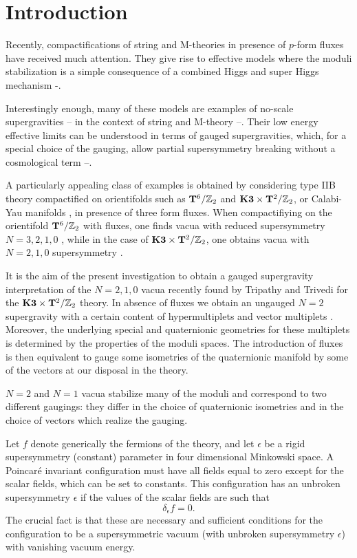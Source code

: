 \documentclass[a4paper,12pt]{article}
\begin{document}
\vfill\eject


\section{Introduction}

Recently, compactifications of string and M-theories in presence
of $p$-form fluxes have received much attention. They give rise to
effective models where the moduli stabilization is a simple
consequence of a combined Higgs and super Higgs mechanism
\cite{ps}-\cite{tt}.

Interestingly enough, many of these models are examples of
no-scale supergravities  \cite{cfkn}--\cite{ckpdfwg} in the
context of string and M-theory \cite{tv}\cite{cklt}--\cite{lm}.
Their low energy effective limits can be understood in terms  of
gauged supergravities, which, for a special choice of the gauging,
allow partial supersymmetry breaking without a cosmological term
\cite{adflf,adfld}\cite{cgp}--\cite{tz}.

A particularly appealing class of examples is obtained by
considering type IIB theory compactified on orientifolds such as
$\mathbf{T}^6/\mathbb{Z}_2$ \cite{fp,kst,dfv,dflv,adflq} and $\mathbf{K3}\times
\mathbf{T}^2/\mathbb{Z}_2$\cite{tt}, or Calabi-Yau manifolds
\cite{ps,tv,ma,lm,da}, in presence of three form fluxes. When
compactifiying on the orientifold $\mathbf{T}^6/\mathbb{Z}_2$ with fluxes, one
finds vacua with reduced supersymmetry $N=3,2,1,0$ \cite{fp,kst,
dfv,dflv}, while in the case of $\mathbf{K3}\times \mathbf{T}^2/\mathbb{Z}_2$, one obtains
vacua with $N=2,1,0$ supersymmetry \cite{tt}.

 It is the aim of the present investigation to obtain a gauged supergravity interpretation
 of the $N=2,1,0$ vacua recently found by Tripathy and Trivedi
 \cite{tt} for the $\mathbf{K3}\times \mathbf{T}^2/\mathbb{Z}_2$ theory.
In absence of fluxes we obtain an ungauged $N=2$ supergravity with
a certain content of hypermultiplets and vector multiplets
\cite{wlp,adcdffm,dfv,dflv}. Moreover, the underlying special and
quaternionic geometries for these multiplets \cite{wlp,baw} is
determined by the properties of the moduli spaces.  The
introduction of fluxes is then equivalent to gauge some isometries
of the quaternionic manifold by some of the vectors at our
disposal in the theory.

$N=2$ and $N=1$ vacua stabilize many of the moduli and correspond
to two different gaugings: they differ in the choice of
quaternionic isometries and in the choice of vectors which realize
the gauging.


Let $f$ denote generically the fermions of the theory, and let
$\epsilon$ be a rigid supersymmetry  (constant) parameter in four
dimensional Minkowski space. A Poincar\'e invariant configuration
must have all fields equal to zero except for the scalar fields,
which can be set to constants. This configuration has an unbroken
supersymmetry $\epsilon$ if the values of the scalar fields are
such that
\begin{equation}\delta_\epsilon f=0.\label{vacuumeq}\end{equation}  The
crucial fact is that these are necessary and sufficient conditions
for the configuration to be a supersymmetric vacuum (with unbroken
supersymmetry $\epsilon$)  with vanishing vacuum energy.
\end{document}
